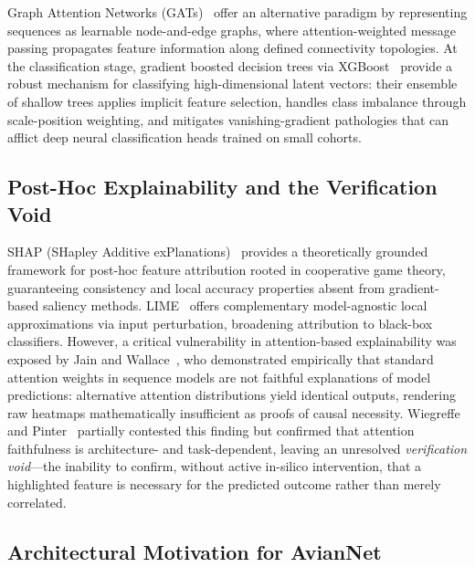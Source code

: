 \documentclass[conference]{IEEEtran}
\begin{document}
Graph Attention Networks (GATs)~\cite{velickovic2018} offer an alternative paradigm by representing sequences as learnable node-and-edge graphs, where attention-weighted message passing propagates feature information along defined connectivity topologies. At the classification stage, gradient boosted decision trees via XGBoost~\cite{chen2016_xgboost} provide a robust mechanism for classifying high-dimensional latent vectors: their ensemble of shallow trees applies implicit feature selection, handles class imbalance through scale-position weighting, and mitigates vanishing-gradient pathologies that can afflict deep neural classification heads trained on small cohorts.

\subsection{Post-Hoc Explainability and the Verification Void}

SHAP (SHapley Additive exPlanations)~\cite{lundberg2017} provides a theoretically grounded framework for post-hoc feature attribution rooted in cooperative game theory, guaranteeing consistency and local accuracy properties absent from gradient-based saliency methods. LIME~\cite{ribeiro2016} offers complementary model-agnostic local approximations via input perturbation, broadening attribution to black-box classifiers. However, a critical vulnerability in attention-based explainability was exposed by Jain and Wallace~\cite{jain2019}, who demonstrated empirically that standard attention weights in sequence models are not faithful explanations of model predictions: alternative attention distributions yield identical outputs, rendering raw heatmaps mathematically insufficient as proofs of causal necessity. Wiegreffe and Pinter~\cite{wiegreffe2019} partially contested this finding but confirmed that attention faithfulness is architecture- and task-dependent, leaving an unresolved \textit{verification void}---the inability to confirm, without active in-silico intervention, that a highlighted feature is necessary for the predicted outcome rather than merely correlated.

\subsection{Architectural Motivation for AvianNet}
\end{document}
